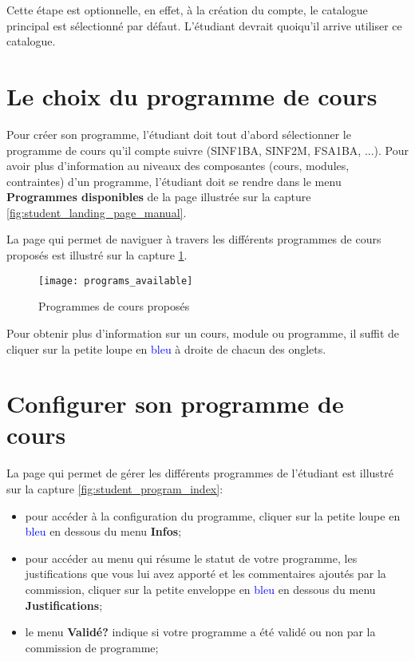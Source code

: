 Cette étape est optionnelle, en effet, à la création du compte, le catalogue principal est sélectionné par défaut. L'étudiant devrait quoiqu'il arrive utiliser ce catalogue.


\section{Le choix du programme de cours}
Pour créer son programme, l'étudiant doit tout d'abord sélectionner le programme de cours qu'il compte suivre (SINF1BA, SINF2M, FSA1BA, ...). Pour avoir plus d'information au niveaux des composantes (cours, modules, contraintes) d'un programme, l'étudiant doit se rendre dans le menu \textbf{Programmes disponibles} de la page illustrée sur la capture \ref{fig:student_landing_page_manual}. 

La page qui permet de naviguer à travers les différents programmes de cours proposés est illustré sur la capture \ref{fig:programs_availables}.

\begin{figure}[htb]
\centering
\caption{Programmes de cours proposés}
\label{fig:programs_availables}
\texttt{[image: programs\_available]}
\end{figure}

Pour obtenir plus d'information sur un cours, module ou programme, il suffit de cliquer sur la petite loupe en \textcolor{blue}{bleu} à droite de chacun des onglets. 

\section{Configurer son programme de cours}

La page qui permet de gérer les différents programmes de l'étudiant est illustré sur la capture \ref{fig:student_program_index}:

\begin{itemize}
\item pour accéder à la configuration du programme, cliquer sur la petite loupe en \textcolor{blue}{bleu} en dessous du menu \textbf{Infos};
\item pour accéder au menu qui résume le statut de votre programme, les justifications que vous lui avez apporté et les commentaires ajoutés par la commission, cliquer sur la petite enveloppe en \textcolor{blue}{bleu} en dessous du menu \textbf{Justifications};
\item le menu \textbf{Validé?} indique si votre programme a été validé ou non par la commission de programme;
\end{itemize}

